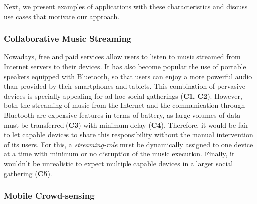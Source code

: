 \begin{enumerate}[label=C\arabic*]
	
\end{enumerate}


Next, we present examples of applications with these characteristics and discuss use cases that motivate our approach.

\subsubsection{Collaborative Music Streaming}

Nowadays, free and paid services allow users to listen to music streamed from Internet servers to their devices. It has also become popular the use of portable speakers equipped with Bluetooth, so that users can enjoy a more powerful audio than provided by their smartphones and tablets. This combination of pervasive devices is specially appealing for ad hoc social gatherings (\textbf{C1, C2}). However, both the streaming of music from the Internet and the communication through Bluetooth are expensive features in terms of battery, as large volumes of data must be transferred (\textbf{C3}) with minimum delay (\textbf{C4}). Therefore, it would be fair to let capable devices to share this responsibility without the manual intervention of its users. For this, a \textit{streaming-role} must be dynamically assigned to one device at a time with minimum or no disruption of the music execution. Finally, it wouldn't be unrealistic to expect multiple capable devices in a larger social gathering  (\textbf{C5}).




\subsubsection{Mobile Crowd-sensing}

